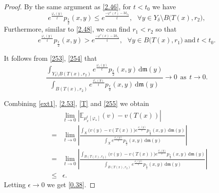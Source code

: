 \documentclass[a4paper,11pt]{article}
\numberwithin{equation}{section}
\theoremstyle{plain}
\theoremstyle{definition}
\theoremstyle{remark}
\newcommand{\mm}{\mathfrak m}
\newcommand{\E}{\mathbb{E}}
\renewcommand{\d}{{\mathrm d}}
\begin{document}
\begin{proof}
By the same argument as \eqref{2.46},  for $t<t_0$ we have \begin{equation}\label{253}
  {e^{\frac{\varphi_*(y)}{t}}p_\frac{t}{2}(x,y)}\leq  {e^{\frac{-\varphi^c(x)-3\delta_{r_2}}{t}}},~~~\forall y\in Y_\delta\setminus B\big(T(x),  r_2\big),
     	\end{equation}
Furthermore,   similar to  \eqref{2.48},   we can find $ r_1<r_2$ so that
     	\begin{equation}\label{254}
  {e^{\frac{\varphi_*(y)}{t}}p_\frac{t}{2}(x,y)}> {e^{\frac{-\varphi^c(x)-2\delta_{r_2}}{t}}},~~~\forall y \in B\big(T(x),  r_1\big)~\text{and}~ t<t_0.
     	\end{equation}
     	
It follows from \eqref{253},  \eqref{254}  that
     \begin{equation}\label{255}
   	\frac{\int_{Y_\delta \setminus B(T(x),  r_2)} e^{\frac{\varphi_*(y)}{t}}p_\frac{t}{2}(x,y)\,\d\mm(y)}{\int_{B(T(x),  r_2)} e^{\frac{\varphi_*(y)}{t}}p_\frac{t}{2}(x,y)\,\d\mm(y)}\to 0 ~~\text{as}~~t\to 0.
     	\end{equation}
     	
Combining \eqref{ext1},  \eqref{2.53}, \eqref{T} and \eqref{255} we obtain
     	\begin{eqnarray*}
     	&&\lim_{t\rightarrow0}|\E_{\mu_x^t[\varphi_{*}]}(v)-v(T(x))|\\&=&\lim_{t\rightarrow0}  \left|	\frac{\int_{ X}  \big(v(y)-v(T(x))\big)e^{\frac{\varphi_*(y)}{t}}p_\frac{t}{2}(x,y)\,\d\mm(y)}{\int_{X} e^{\frac{\varphi_*(y)}{t}}p_\frac{t}{2}(x,y)\,\d\mm(y)}\right|\\ 
     	&=&\lim_{t\rightarrow0}  \left|	\frac{\int_{B(T(x),  r_2)}  \big(v(y)-v(T(x))\big)e^{\frac{\varphi_*(y)}{t}}p_\frac{t}{2}(x,y)\,\d\mm(y)}{\int_{B(T(x),  r_2)} e^{\frac{\varphi_*(y)}{t}}p_\frac{t}{2}(x,y)\,\d\mm(y)}\right|\\ &\leq & \epsilon.
     	\end{eqnarray*}
Letting $\epsilon \to 0$ we get \eqref{0.38}.
     	
     
     \end{proof}
	
	\bigskip
	
\end{document}
